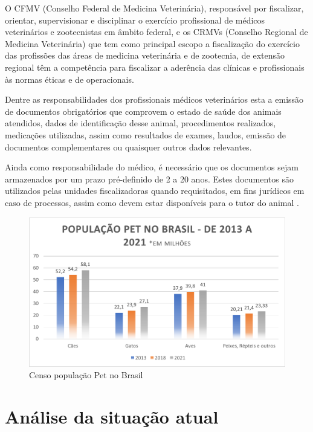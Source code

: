 \documentclass[
    12pt,               %
    openright,          %
    oneside,
    a4paper,            %
    BIBLATEX,           %
    TODO,               %
    english,            %
    brazil              %
    ]{ifsp-spo-inf-ctds}
\begin{document}
    O CFMV (Conselho Federal de Medicina Veterinária), responsável por fiscalizar, orientar, supervisionar e disciplinar o exercício profissional de médicos veterinários e zootecnistas em âmbito federal, e os CRMVs (Conselho Regional de Medicina Veterinária) que tem como principal escopo a fiscalização do exercício das profissões das áreas de medicina veterinária e de zootecnia, de extensão regional\cite{doc_obrig} têm a competência para fiscalizar a aderência das clínicas e profissionais às normas éticas e de  operacionais.
     
    Dentre as responsabilidades dos profissionais médicos veterinários esta a emissão de documentos obrigatórios que comprovem o estado de saúde dos animais atendidos, dados de identificação desse animal, procedimentos realizados, medicações utilizadas, assim como resultados de exames, laudos, emissão de documentos complementares ou quaisquer outros dados relevantes.
    
    Ainda como responsabilidade do médico, é necessário que os documentos sejam armazenados por um prazo pré-definido de 2 a 20 anos. Estes documentos são utilizados pelas unidades fiscalizadoras quando requisitados, em fins jurídicos em caso de processos, assim como devem estar disponíveis para o tutor do animal \cite{doc_obrig}.
     
     \begin{figure}[H]
        \centering
        \includegraphics{images/grafico_censopet.png}
        \caption{Censo população Pet no Brasil\cite{ibge2013, ibge2018, pet2021}}
        \label{fig:grafico pet}
    \end{figure}

    \section{Análise da situação atual}
    
\end{document}
